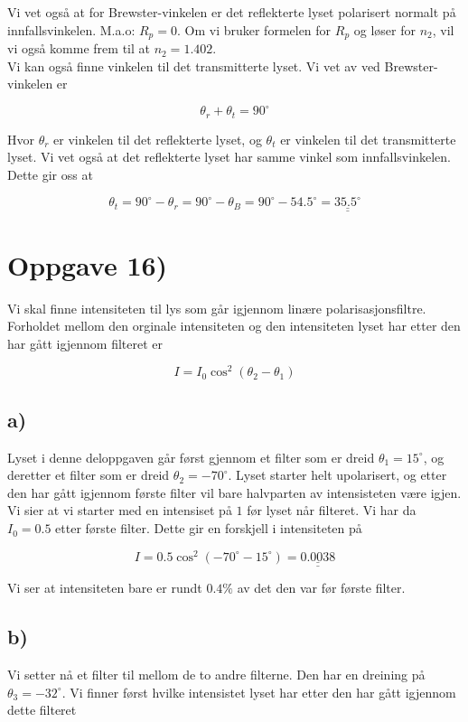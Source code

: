 \documentclass[a4paper,norsk, 10pt]{article}
\begin{document}
Vi vet også at for Brewster-vinkelen er det reflekterte lyset polarisert normalt på innfallsvinkelen. M.a.o: $R_p = 0$. Om vi bruker formelen for $R_p$ og løser for $n_2$, vil vi også komme frem til at $n_2 = 1.402$.\\

Vi kan også finne vinkelen til det transmitterte lyset. Vi vet av ved Brewster-vinkelen er

$$
\theta_r + \theta_t = 90^{\circ}
$$

Hvor $\theta_r$ er vinkelen til det reflekterte lyset, og $\theta_t$ er vinkelen til det transmitterte lyset. Vi vet også at det reflekterte lyset har samme vinkel som innfallsvinkelen. Dette gir oss at

$$
\theta_t = 90^{\circ} - \theta_r = 90^{\circ} - \theta_B = 90^{\circ} - 54.5^{\circ} = \underline{\underline{35.5^{\circ}}}
$$


\section*{Oppgave 16)}

Vi skal finne intensiteten til lys som går igjennom linære polarisasjonsfiltre. Forholdet mellom den orginale intensiteten og den intensiteten lyset har etter den har gått igjennom filteret er

\begin{equation}
I = I_0\cos^2(\theta_2 - \theta_1)
\label{eq:filter}
\end{equation}

\subsection*{a)}
Lyset i denne deloppgaven går først gjennom et filter som er dreid $\theta_1 = 15^{\circ}$, og deretter et filter som er dreid $\theta_2 = -70^{\circ}$. Lyset starter helt upolarisert, og etter den har gått igjennom første filter vil bare halvparten av intensisteten være igjen. Vi sier at vi starter med en intensiset på $1$ før lyset når filteret. Vi har da $I_0 = 0.5$ etter første filter. Dette gir en forskjell i intensiteten på

$$
I = 0.5\cos^2(-70^{\circ} - 15^{\circ}) = \underline{\underline{0.0038}}
$$

Vi ser at intensiteten bare er rundt $0.4 \%$ av det den var før første filter.


\subsection*{b)}
Vi setter nå et filter til mellom de to andre filterne. Den har en dreining på $\theta_3 = -32^{\circ}$. Vi finner først hvilke intensistet lyset har etter den har gått igjennom dette filteret
\end{document}
